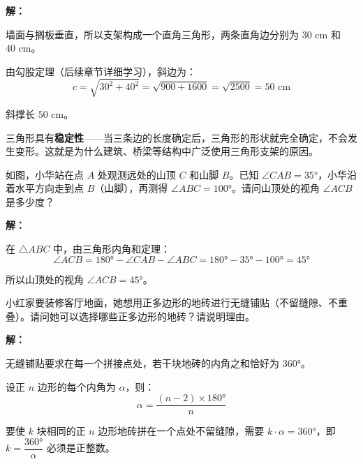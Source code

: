 \documentclass[12pt, a4paper]{ctexart}
\begin{document}
\textbf{解：}

墙面与搁板垂直，所以支架构成一个直角三角形，两条直角边分别为 $30\text{ cm}$ 和 $40\text{ cm}$。

由勾股定理（后续章节详细学习），斜边为：
\[
c = \sqrt{30^2 + 40^2} = \sqrt{900 + 1600} = \sqrt{2500} = 50 \text{ cm}
\]

斜撑长 $50\text{ cm}$。

三角形具有\textbf{稳定性}——当三条边的长度确定后，三角形的形状就完全确定，不会发生变形。这就是为什么建筑、桥梁等结构中广泛使用三角形支架的原因。

\begin{appbox}[【应用2】测量中的三角形内角和]
如图，小华站在点 $A$ 处观测远处的山顶 $C$ 和山脚 $B$。已知 $\angle CAB = 35°$，小华沿着水平方向走到点 $B$（山脚），再测得 $\angle ABC = 100°$。请问山顶处的视角 $\angle ACB$ 是多少度？

\begin{center}
\end{center}
\end{appbox}

\textbf{解：}

在 $\triangle ABC$ 中，由三角形内角和定理：
\[
\angle ACB = 180° - \angle CAB - \angle ABC = 180° - 35° - 100° = 45°
\]

所以山顶处的视角 $\angle ACB = 45°$。

\begin{appbox}[【应用3】正多边形铺地砖]
小红家要装修客厅地面，她想用正多边形的地砖进行无缝铺贴（不留缝隙、不重叠）。请问她可以选择哪些正多边形的地砖？请说明理由。
\end{appbox}

\textbf{解：}

无缝铺贴要求在每一个拼接点处，若干块地砖的内角之和恰好为 $360°$。

设正 $n$ 边形的每个内角为 $\alpha$，则：
\[
\alpha = \frac{(n-2) \times 180°}{n}
\]

要使 $k$ 块相同的正 $n$ 边形地砖拼在一个点处不留缝隙，需要 $k \cdot \alpha = 360°$，即 $k = \dfrac{360°}{\alpha}$ 必须是正整数。
\end{document}
